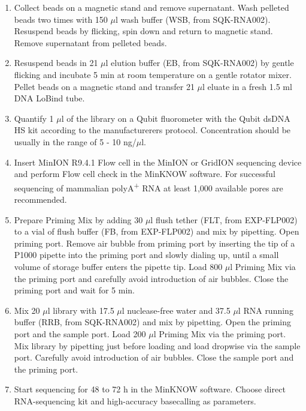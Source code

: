 \documentclass[times, 11pt, a4paper]{article}
\begin{document}
\begin{enumerate}
\item Collect beads on a magnetic stand and remove supernatant. Wash pelleted beads two times with 150 $\mu$l wash buffer (WSB, from SQK-RNA002). Resuspend beads by flicking, spin down and return to magnetic stand. Remove supernatant from pelleted beads.

\item Resuspend beads in 21 $\mu$l elution buffer (EB, from SQK-RNA002) by gentle flicking and incubate 5 min at room temperature on a gentle rotator mixer. Pellet beads on a magnetic stand and transfer 21 $\mu$l eluate in a fresh 1.5 ml DNA LoBind tube.

\item Quantify 1 $\mu$l of the library on a Qubit fluorometer with the Qubit dsDNA HS kit according to the manufacturerers protocol. Concentration should be usually in the range of 5 - 10 ng/$\mu$l.

\item Insert MinION R9.4.1 Flow cell in the MinION or GridION sequencing device and perform Flow cell check in the MinKNOW software. For successful sequencing of mammalian polyA\textsuperscript{+} RNA at least 1,000 available pores are recommended.

\item Prepare Priming Mix by adding 30 $\mu$l flush tether (FLT, from EXP-FLP002) to a vial of flush buffer (FB, from EXP-FLP002) and mix by pipetting. Open priming port. Remove air bubble from priming port by inserting the tip of a P1000 pipette into the priming port and slowly dialing up, until a small volume of storage buffer enters the pipette tip. Load 800 $\mu$l Priming Mix via the priming port and carefully avoid introduction of air bubbles. Close the priming port and wait for 5 min.

\item Mix 20 $\mu$l library with 17.5 $\mu$l nuclease-free water and 37.5 $\mu$l RNA running buffer (RRB, from SQK-RNA002) and mix by pipetting. Open the priming port and the sample port. Load 200 $\mu$l Priming Mix via the priming port. Mix library by pipetting just before loading and load dropwise via the sample port. Carefully avoid introduction of air bubbles. Close the sample port and the priming port.

\item Start sequencing for 48 to 72 h in the MinKNOW software. Choose direct RNA-sequencing kit and high-accuracy basecalling as parameters. 

\end{enumerate}
\end{document}

